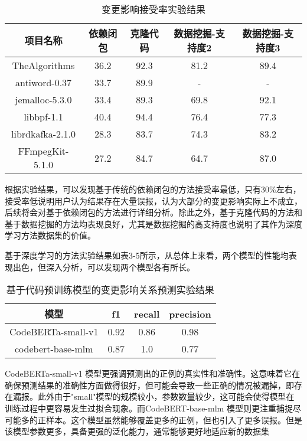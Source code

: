 \begin{table}[htbp]
\caption{变更影响接受率实验结果}
\vspace{0.5em}\centering\wuhao
\begin{tabular}{ccccc}
\toprule
项目名称 & 依赖闭包 & 克隆代码 & 数据挖掘-支持度2 & 数据挖掘-支持度3 \\
\midrule
TheAlgorithms & 36.2 & 92.3 & 81.2 & 89.4\\
antiword-0.37 & 33.7 & 89.9 & - & -\\
jemalloc-5.3.0 & 33.4 & 89.3 & 69.8 & 92.1\\
libbpf-1.1 & 40.4 & 94.4 & 76.4 & 77.3\\
librdkafka-2.1.0 & 28.3 & 83.7 & 74.3 & 83.2\\
FFmpegKit-5.1.0 & 27.2 & 84.7 & 64.7 & 87.0\\

\bottomrule
\end{tabular}
\end{table}

根据实验结果，可以发现基于传统的依赖闭包的方法接受率最低，只有30\%左右，接受率低说明用户认为结果存在大量误报，认为大部分的变更影响实际上不成立，后续将会对基于依赖闭包的方法进行详细分析。除此之外，基于克隆代码的方法和基于数据挖掘的方法均表现良好，尤其是数据挖掘的高支持度也说明了其作为深度学习方法数据集的价值。


基于深度学习的方法实验结果如表3-5所示，从总体上来看，两个模型的性能均表现出色，但深入分析，可以发现两个模型各有所长。

\begin{table}[htbp]
\caption{基于代码预训练模型的变更影响关系预测实验结果}
\vspace{0.5em}\centering\wuhao
\begin{tabular}{cccc}
\toprule
模型& f1 & recall & precision \\
\midrule
CodeBERTa-small-v1 & 0.92 & 0.86 & 0.98 \\
codebert-base-mlm  & 0.87 & 1.0  & 0.77 \\
\bottomrule
\end{tabular}
\end{table}

CodeBERTa-small-v1 模型更强调预测出的正例的真实性和准确性。这意味着它在确保预测结果的准确性方面做得很好，但可能会导致一些正确的情况被漏掉，即存在漏报。此外由于"small"模型的规模较小，参数数量较少，这可能会使得模型在训练过程中更容易发生过拟合现象。而CodeBERT-base-mlm 模型则更注重捕捉尽可能多的正样本。这个模型虽然能够覆盖更多的正例，但也引入了更多误报。但是该模型参数更多，具备更强的泛化能力，通常能够更好地适应新的数据集

